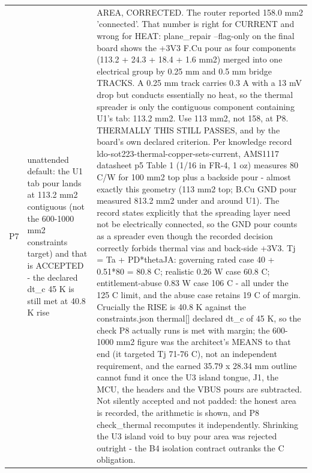 \documentclass[11pt,a4paper]{article}
\begin{document}
{\begin{longtable}{lp{5.2cm}p{7.2cm}}
P7 & unattended default: the U1 tab pour lands at 113.2 mm2 contiguous (not the 600-1000 mm2 constraints target) and that is ACCEPTED - the declared dt\_c 45 K is still met at 40.8 K rise & AREA, CORRECTED. The router reported 158.0 mm2 'connected'. That number is right for CURRENT and wrong for HEAT: plane\_repair --flag-only on the final board shows the +3V3 F.Cu pour as four components (113.2 + 24.3 + 18.4 + 1.6 mm2) merged into one electrical group by 0.25 mm and 0.5 mm bridge TRACKS. A 0.25 mm track carries 0.3 A with a 13 mV drop but conducts essentially no heat, so the thermal spreader is only the contiguous component containing U1's tab: 113.2 mm2. Use 113 mm2, not 158, at P8. THERMALLY THIS STILL PASSES, and by the board's own declared criterion. Per knowledge record ldo-sot223-thermal-copper-sets-current, AMS1117 datasheet p5 Table 1 (1/16 in FR-4, 1 oz) measures 80 C/W for 100 mm2 top plus a backside pour - almost exactly this geometry (113 mm2 top; B.Cu GND pour measured 813.2 mm2 under and around U1). The record states explicitly that the spreading layer need not be electrically connected, so the GND pour counts as a spreader even though the recorded decision correctly forbids thermal vias and back-side +3V3. Tj = Ta + PD{*}thetaJA: governing rated case 40 + 0.51{*}80 = 80.8 C; realistic 0.26 W case 60.8 C; entitlement-abuse 0.83 W case 106 C - all under the 125 C limit, and the abuse case retains 19 C of margin. Crucially the RISE is 40.8 K against the constraints.json thermal{[}{]} declared dt\_c of 45 K, so the check P8 actually runs is met with margin; the 600-1000 mm2 figure was the architect's MEANS to that end (it targeted Tj 71-76 C), not an independent requirement, and the earned 35.79 x 28.34 mm outline cannot fund it once the U3 island tongue, J1, the MCU, the headers and the VBUS pours are subtracted. Not silently accepted and not padded: the honest area is recorded, the arithmetic is shown, and P8 check\_thermal recomputes it independently. Shrinking the U3 island void to buy pour area was rejected outright - the B4 isolation contract outranks the C obligation. \\

\end{longtable}}
\end{document}
